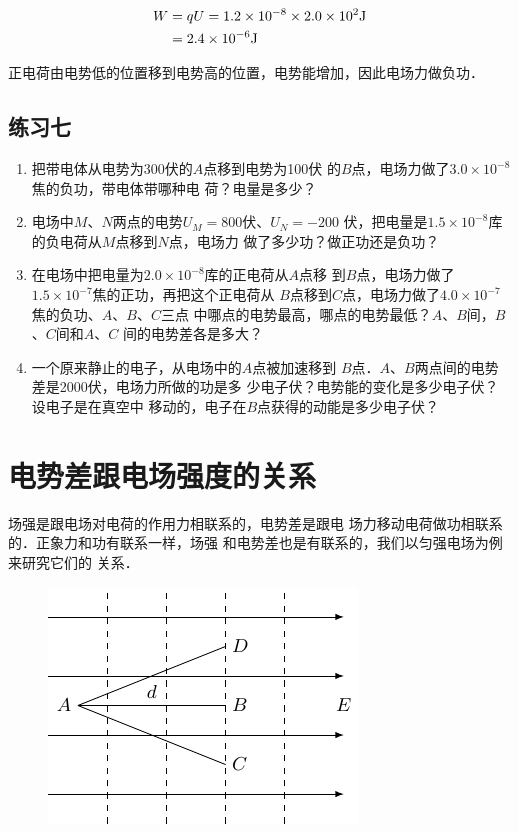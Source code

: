 \begin{solution}
\[\begin{split}
    W&=qU=1.2\times10^{-8}\times2.0\times10^2{\rm J}\\
&=2.4\times10^{-6}{\rm J}
\end{split} \]

正电荷由电势低的位置移到电势高的位置，电势能增加，因此电场力做负功．
\end{solution}

\subsection*{练习七}

\begin{enumerate}
    \item 把带电体从电势为300伏的$A$点移到电势为100伏
的$B$点，电场力做了$3.0\times10^{-8}$焦的负功，带电体带哪种电
荷？电量是多少？
\item 电场中$M$、$N$两点的电势$U_M=800$伏、$U_N=-200$
伏，把电量是$1.5\times10^{-8}$库的负电荷从$M$点移到$N$点，电场力
做了多少功？做正功还是负功？
\item 在电场中把电量为$2.0\times10^{-8}$库的正电荷从$A$点移
到$B$点，电场力做了$1.5\times10^{-7}$焦的正功，再把这个正电荷从
$B$点移到$C$点，电场力做了$4.0\times10^{-7}$焦的负功、$A$、$B$、$C$三点
中哪点的电势最高，哪点的电势最低？$A$、$B$间，$B$、$C$间和$A$、$C$
间的电势差各是多大？
\item 一个原来静止的电子，从电场中的$A$点被加速移到
$B$点．$A$、$B$两点间的电势差是2000伏，电场力所做的功是多
少电子伏？电势能的变化是多少电子伏？设电子是在真空中
移动的，电子在$B$点获得的动能是多少电子伏？
\end{enumerate}


\section{电势差跟电场强度的关系}
场强是跟电场对电荷的作用力相联系的，电势差是跟电
场力移动电荷做功相联系的．正象力和功有联系一样，场强
和电势差也是有联系的，我们以匀强电场为例来研究它们的
关系．
\begin{figure}[htbp]
    \centering
    \includegraphics{fig/B/6-24.pdf}
    \caption{}\label{fig_B_6-24}
\end{figure}

